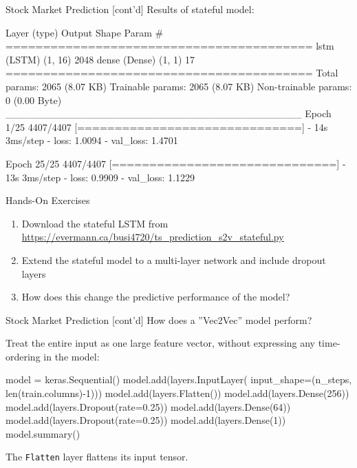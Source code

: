 \documentclass[ignorenonframetext,xcolor=x11names]{beamer}
\begin{document}
\begin{frame}[fragile]{Stock Market Prediction \small [cont'd]}
Results of stateful model:

\begin{textcode}
 Layer (type)    Output Shape    Param #   
=========================================
 lstm (LSTM)     (1, 16)         2048      
 dense (Dense)   (1, 1)          17        
=========================================
Total params: 2065 (8.07 KB)
Trainable params: 2065 (8.07 KB)
Non-trainable params: 0 (0.00 Byte)
_________________________________________
Epoch 1/25
4407/4407 [==============================] 
- 14s 3ms/step - loss: 1.0094 - val_loss: 1.4701

Epoch 25/25
4407/4407 [==============================] 
- 13s 3ms/step - loss: 0.9909 - val_loss: 1.1229
\end{textcode}
\end{frame}

\begin{frame}[fragile]{Hands-On Exercises}
\begin{enumerate}
    \item Download the stateful LSTM from \url{https://evermann.ca/busi4720/ts_prediction_s2v_stateful.py}
    \item Extend the stateful model to a multi-layer network and include dropout layers
    \item How does this change the predictive performance of the model?
\end{enumerate}
\end{frame}

\begin{frame}[fragile]{Stock Market Prediction \small [cont'd]}
How does a ''Vec2Vec'' model perform?

Treat the entire input as one large feature vector, without expressing any time-ordering in the model:
\begin{pythoncode}
model = keras.Sequential()
model.add(layers.InputLayer(
    input_shape=(n_steps,
                 len(train.columns)-1)))
model.add(layers.Flatten())
model.add(layers.Dense(256))
model.add(layers.Dropout(rate=0.25))
model.add(layers.Dense(64))
model.add(layers.Dropout(rate=0.25))
model.add(layers.Dense(1))
model.summary()
\end{pythoncode}
The \texttt{Flatten} layer flattens its input tensor.
\end{frame}
\end{document}
